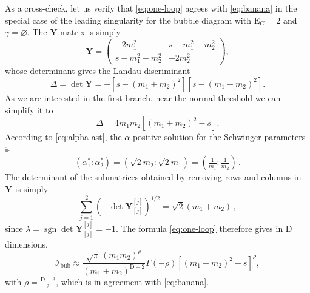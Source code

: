 \documentclass[12pt]{article}
\numberwithin{figure}{section}
\DeclareMathOperator{\sgn}{sgn}
\def \be {\begin{equation}}
\def \ee {\end{equation}}
\def \D {\mathrm{D}}
\def \E {\mathrm{E}}
\def \I {\mathcal{I}}
\def \Y {\mathbf{Y}}
\begin{document}
				As a cross-check, let us verify that \eqref{eq:one-loop} agrees with \eqref{eq:banana} in the special case of the leading singularity for the bubble diagram with $\E_{G} = 2$ and $\gamma = \varnothing$. The $\Y$ matrix is simply
				\be
				\Y = \begin{pmatrix}
                -2m_1^2 & s - m_1^2 - m_2^2\\
                s - m_1^2 - m_2^2 & -2m_2^2
                \end{pmatrix},
				\ee
				whose determinant gives the Landau discriminant
				\be
				\Delta = \det \Y = - \left[s - (m_1 + m_2)^2\right] \left[s - (m_1 - m_2)^2\right].
				\ee
				As we are interested in the first branch, near the normal threshold we can simplify it to
				\be
				\Delta = 4 m_1 m_2 [(m_1 + m_2)^2 - s ].
				\ee
				According to \eqref{eq:alpha-ast}, the $\alpha$-positive solution for the Schwinger parameters is
				\be
				(\alpha_1^\ast : \alpha_2^\ast ) = 
				(\sqrt{2} m_2: \sqrt{2} m_1) = (\tfrac{1}{m_1} : \tfrac{1}{m_2})\,.
				\ee
				The determinant of the submatrices obtained by removing rows and columns in $\Y$ is simply
				\be 
				    \sum_{j=1}^{2} \left(- \det \Y_{[j]}^{[j]} \right)^{1/2}
				    =
				    \sqrt{2}(m_1+m_2)\,,
				\ee 
				since $\lambda = \sgn \det \Y_{[j]}^{[j]}=-1$.
				The formula \eqref{eq:one-loop} therefore gives in $\D$ dimensions,
				\be
				    \I_{\text{bub}} \approx 
				    \frac{\sqrt{\pi} \, (m_1 m_2)^\rho }{ (m_1 + m_2)^{\D-2}} \Gamma(-\rho)  [(m_1 + m_2)^2 - s]^{\rho},
				\ee
				with $\rho=\frac{\D-3}{2}$, which is in agreement with \eqref{eq:banana}.
				
\end{document}
